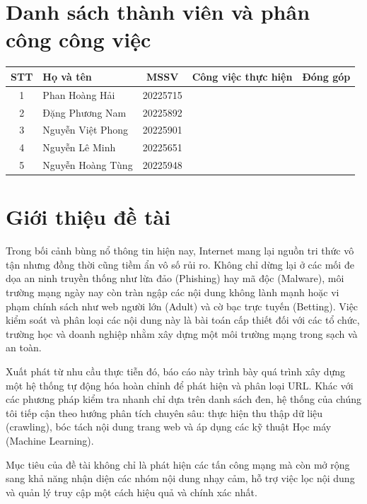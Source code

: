 \documentclass[a4paper,12pt]{report}
\begin{document}
\section*{Danh sách thành viên và phân công công việc}
\begin{table}[H]
    \centering
    \begin{tabular}{|c|l|c|l|c|}
        \hline
        \textbf{STT} & \textbf{Họ và tên} & \textbf{MSSV} & \textbf{Công việc thực hiện} & \textbf{Đóng góp} \\
        \hline
        1 & Phan Hoàng Hải & 20225715 & & \\ \hline
        2 & Đặng Phương Nam & 20225892 & & \\ \hline
        3 & Nguyễn Việt Phong & 20225901 & & \\ \hline
        4 & Nguyễn Lê Minh & 20225651 & & \\ \hline
        5 & Nguyễn Hoàng Tùng & 20225948 & & \\ \hline
    \end{tabular}
\end{table}

\section*{Giới thiệu đề tài}
Trong bối cảnh bùng nổ thông tin hiện nay, Internet mang lại nguồn tri thức vô tận nhưng đồng thời cũng tiềm ẩn vô số rủi ro. Không chỉ dừng lại ở các mối đe dọa an ninh truyền thống như lừa đảo (Phishing) hay mã độc (Malware), môi trường mạng ngày nay còn tràn ngập các nội dung không lành mạnh hoặc vi phạm chính sách như web người lớn (Adult) và cờ bạc trực tuyến (Betting). Việc kiểm soát và phân loại các nội dung này là bài toán cấp thiết đối với các tổ chức, trường học và doanh nghiệp nhằm xây dựng một môi trường mạng trong sạch và an toàn.

Xuất phát từ nhu cầu thực tiễn đó, báo cáo này trình bày quá trình xây dựng một hệ thống tự động hóa hoàn chỉnh để phát hiện và phân loại URL. Khác với các phương pháp kiểm tra nhanh chỉ dựa trên danh sách đen, hệ thống của chúng tôi tiếp cận theo hướng phân tích chuyên sâu: thực hiện thu thập dữ liệu (crawling), bóc tách nội dung trang web và áp dụng các kỹ thuật Học máy (Machine Learning).

Mục tiêu của đề tài không chỉ là phát hiện các tấn công mạng mà còn mở rộng sang khả năng nhận diện các nhóm nội dung nhạy cảm, hỗ trợ việc lọc nội dung và quản lý truy cập một cách hiệu quả và chính xác nhất.
\end{document}
